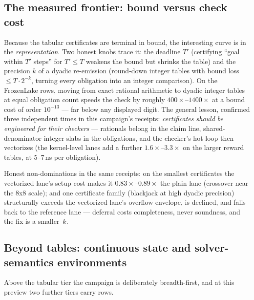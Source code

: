 \subsection{The measured frontier: bound versus check cost}
\label{sec:exp-gym-frontier}

Because the tabular certificates are terminal in bound, the
interesting curve is in the \emph{representation}. Two honest knobs
trace it: the deadline $T'$ (certifying ``goal within $T'$ steps'' for
$T' \le T$ weakens the bound but shrinks the table) and the precision
$k$ of a dyadic re-emission (round-down integer tables with bound loss
$\le T \cdot 2^{-k}$, turning every obligation into an integer
comparison). On the FrozenLake rows, moving from exact rational
arithmetic to dyadic integer tables at equal obligation count speeds
the check by roughly $400\times$--$1400\times$ at a bound cost of
order $10^{-13}$ --- far below any displayed digit. The general
lesson, confirmed three independent times in this campaign's receipts:
\emph{certificates should be engineered for their checkers} ---
rationals belong in the claim line, shared-denominator integer slabs
in the obligations, and the checker's hot loop then vectorizes (the
kernel-level lanes add a further $1.6\times$--$3.3\times$ on the
larger reward tables, at $5$--$7$\,ns per obligation).

Honest non-dominations in the same receipts: on the smallest
certificates the vectorized lane's setup cost makes it
$0.83\times$--$0.89\times$ the plain lane (crossover near the 8x8
scale); and one certificate family (blackjack at high dyadic
precision) structurally exceeds the vectorized lane's overflow
envelope, is declined, and falls back to the reference lane ---
deferral costs completeness, never soundness, and the fix is a
smaller~$k$.

\subsection{Beyond tables: continuous state and solver-semantics
environments}
\label{sec:exp-gym-beyond}

Above the tabular tier the campaign is deliberately breadth-first, and
at this preview two further tiers carry rows.

